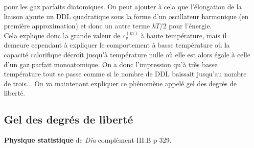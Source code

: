 \documentclass[12pt,prb,aps,epsf]{article}
\begin{document}
pour les gaz parfaits diatomiques. On peut ajouter à cela que l'élongation de la liaison ajoute un DDL quadratique sous la forme d'un oscillateur harmonique (en première approximation) et donc un autre terme $kT/2$ pour l'énergie.\\ 
Cela explique donc la grande valeur de $c_v^{(m)}$ à haute température, mais il demeure cependant à expliquer le comportement à basse température où la capacité calorifique décroît jusqu'à température nulle où elle est alors égale à celle d'un gaz parfait monoatomique. On a donc l'impression qu'à très basse température tout se passe comme si le nombre de DDL baissait jusqu'au nombre de trois... On va maintenant expliquer ce phénomène appelé gel des degrés de liberté.

\subsection{Gel des degrés de liberté}
\textbf{Physique statistique} de \textit{Diu} complément III.B p 329.\\
\end{document}
